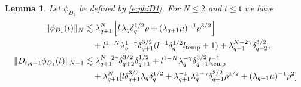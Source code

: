 \documentclass[10pt,a4paper]{amsart}
\numberwithin{equation}{section}
\numberwithin{corollario}{section}
\newtheorem{lemma}{Lemma}
\numberwithin{lemma}{section}
\numberwithin{prop}{section}
\theoremstyle{definition}
\theoremstyle{remark}
\newcommand{\qq}{_{q+1}}
\begin{document}
\begin{lemma}\label{lemma:phiD1}
Let $\phi_{D_1}$ be defined by \eqref{e:phiD1}.
For $N\le 2$ and $t\le \mathfrak{t}$ we have
    \begin{align}
    \|\phi_{D_1}(t)\|_N
    &\lesssim 
    \lambda\qq^N\left[l\,\lambda_q\delta_q^{1/2}\rho+(\lambda\qq\mu)^{-1}\rho^{3/2}\right]\\
    &\quad
    +l^{1-N}\lambda_q^{1-\gamma}\delta\qq^{3/2}(l^{-1}\delta_q^{1/2}l_{\rm temp}+1)+\lambda\qq ^{N-2\gamma}\delta_{q+2}^{3/2},
    \\
    \|D_{t,q+1}\phi_{D_1}(t)\|_{N-1}
    &\lesssim 
    \lambda\qq ^{N-2\gamma}\delta_{q+2}^{3/2}\delta\qq^{1/2}+l^{1-N}\lambda_q^{-\gamma}\delta\qq^{3/2}l_{\rm temp}^{-1}\\
   &\quad+\lambda\qq^N[l\delta\qq^{3/2}\lambda_q\delta_q^{1/2}+\lambda\qq^{-1}\lambda_q^{1-\gamma}\delta\qq^{3/2}\rho^{1/2}+(\lambda\qq\mu)^{-1}\rho^{2}]
    \end{align}
\end{lemma}
\end{document}
